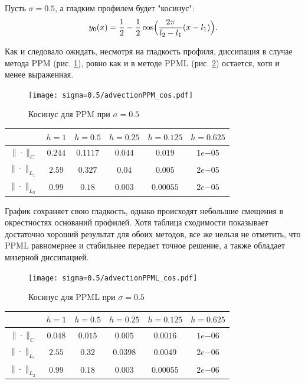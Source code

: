 \documentclass[12pt,a4paper]{article}
\newcommand{\picref}[1]{рис. \ref{#1}}
\begin{document}
    Пусть $ \sigma = 0.5 $, а гладким профилем будет "косинус":
    \[
        y_0(x) = \dfrac{1}{2} - \dfrac{1}{2} \cos\Bigl(\dfrac{2 \pi}{l_2 - l_1}(x-l_1)\Bigr).
    \]

    Как и следовало ожидать, несмотря на гладкость профиля, диссипация в случае метода PPM (\picref{fig:ppm_cos_05}), ровно как и в методе PPML (\picref{fig:ppml_cos_05}) остается, хотя и менее выраженная. 

    \pagebreak

    \begin{figure}[h]
        \centering
        \texttt{[image: sigma=0.5/advectionPPM\_cos.pdf]}
        \caption{Косинус для PPM при $ \sigma = 0.5 $}
        \label{fig:ppm_cos_05}
    \end{figure}

    \begin{center}
        \begin{tabular}{ |c|c|c|c|c|c| } 
         \hline
         & $ h=1 $ &  $ h=0.5$ &  $ h=0.25 $ &  $ h=0.125 $ &  $ h=0.625 $ \\ 
         \hline
         $\| \cdot \|_{C}$ & $0.244$ & $0.1117$ & $0.044$ & $0.019$ & $1e{-05}$
         \\
         \hline
         $\| \cdot \|_{L_1}$ & $2.59$ & $0.327$ & $0.04$ & $0.005$ & $2e{-05}$
         \\
         \hline
         $\| \cdot \|_{L_2}$ & $0.99$ & $0.18$ & $0.003$ & $0.00055$ & $2e{-05}$ 
         \\
         \hline
        \end{tabular}
    \end{center}

    График сохраняет свою гладкость, однако происходят небольшие смещения в окрестностях оснований профилей. Хотя таблица сходимости показывает достаточно хороший результат для обоих методов, все же нельзя не отметить, что PPML равномернее и стабильнее передает точное решение, а также обладает мизерной диссипацией. 

    \pagebreak

    \begin{figure}[h]
        \centering
        \texttt{[image: sigma=0.5/advectionPPML\_cos.pdf]}
        \caption{Косинус для PPML при $ \sigma = 0.5 $}
        \label{fig:ppml_cos_05}
    \end{figure}

    \begin{center}
        \begin{tabular}{ |c|c|c|c|c|c| } 
         \hline
         & $ h=1 $ &  $ h=0.5$ &  $ h=0.25 $ &  $ h=0.125 $ &  $ h=0.625 $ \\ 
         \hline
         $\| \cdot \|_{C}$ & $0.048$ & $0.015$ & $0.005$ & $0.0016$ & $1e{-06}$
         \\
         \hline
         $\| \cdot \|_{L_1}$ & $2.55$ & $0.32$ & $0.0398$ & $0.0049$ & $2e{-06}$
         \\
         \hline
         $\| \cdot \|_{L_2}$ & $0.99$ & $0.18$ & $0.003$ & $0.00055$ & $2e{-06}$ 
         \\
         \hline
        \end{tabular}
    \end{center}
\end{document}
